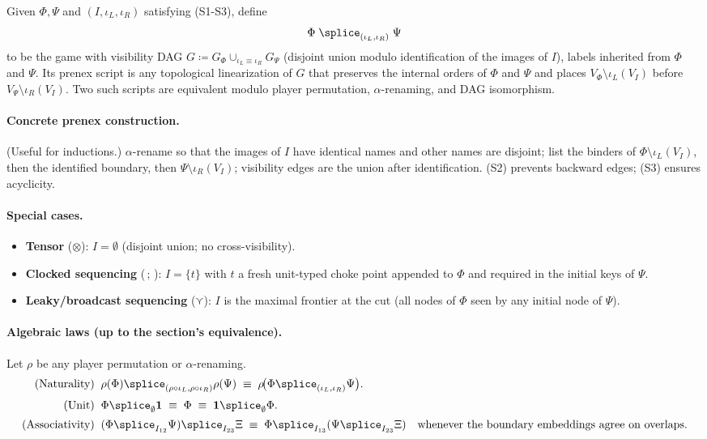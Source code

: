 \begin{definition}[Splice]
\label{def:splice}
Given $\Phi,\Psi$ and $(I,\iota_L,\iota_R)$ satisfying (S1-S3), define
\[
  \Phi \;\splice_{(\iota_L,\iota_R)}\; \Psi
\]
to be the game with visibility DAG
\(
  G \coloneqq G_\Phi \cup_{\iota_L\equiv\iota_R} G_\Psi
\)
(disjoint union modulo identification of the images of $I$), labels inherited
from $\Phi$ and $\Psi$. Its prenex script is any topological linearization of
$G$ that preserves the internal orders of $\Phi$ and $\Psi$ and places
$V_\Phi\setminus \iota_L(V_I)$ before $V_\Psi\setminus \iota_R(V_I)$.
Two such scripts are equivalent modulo player permutation, $\alpha$-renaming,
and DAG isomorphism.
\end{definition}

\paragraph{Concrete prenex construction.}
(Useful for inductions.) $\alpha$-rename so that the images of $I$ have identical
names and other names are disjoint; list the binders of
$\Phi\setminus \iota_L(V_I)$, then the identified boundary, then
$\Psi\setminus \iota_R(V_I)$; visibility edges are the union after identification.
(S2) prevents backward edges; (S3) ensures acyclicity.

\paragraph{Special cases.}
\begin{itemize}
\item \textbf{Tensor} ($\otimes$): $I=\emptyset$ (disjoint union; no cross-visibility).
\item \textbf{Clocked sequencing} ($\,;\,$): $I=\{t\}$ with $t$ a fresh unit-typed
  choke point appended to $\Phi$ and required in the initial keys of $\Psi$.
\item \textbf{Leaky/broadcast sequencing} ($\curlyvee$): $I$ is the maximal frontier
  at the cut (all nodes of $\Phi$ seen by any initial node of $\Psi$).
\end{itemize}

\paragraph{Algebraic laws (up to the section’s equivalence).}
Let $\rho$ be any player permutation or $\alpha$-renaming.
\begin{align*}
\text{(Naturality)}\;\;&
\rho(\Phi) \splice_{(\rho\circ\iota_L,\rho\circ\iota_R)} \rho(\Psi)
\;\equiv\; \rho\!\big(\Phi \splice_{(\iota_L,\iota_R)} \Psi\big).\\[2pt]
\text{(Unit)}\;\;&
\Phi \splice_{\emptyset} \mathbf{1} \;\equiv\; \Phi \;\equiv\; \mathbf{1} \splice_{\emptyset} \Phi.\\[2pt]
\text{(Associativity)}\;\;&
(\Phi \splice_{I_{12}} \Psi) \splice_{I_{23}} \Xi
\;\equiv\;
\Phi \splice_{I_{13}} (\Psi \splice_{I_{23}} \Xi)
\quad\text{whenever the boundary embeddings agree on overlaps.}
\end{align*}

